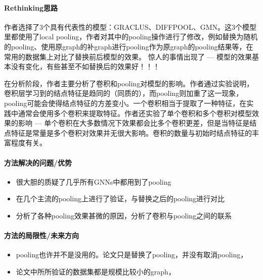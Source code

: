 \paragraph{Rethinking思路}
作者选择了3个具有代表性的模型：GRACLUS\cite{dhillon2007weighted}、DIFFPOOL\cite{ying2019hierarchical}、GMN\cite{khasahmadi2020memory-based}。这3个模型里都使用了local pooling，作者对其中的pooling操作进行了修改，例如替换为随机的pooling、使用原graph的补graph进行pooling作为原graph的pooling结果等，在常用的数据集上对比了替换前后模型的效果。
惊人的事情出现了 --- 模型的效果基本没有变化，有些甚至不如替换后的效果好！！！

在分析阶段，作者主要分析了卷积和pooling对模型的影响。作者通过实验说明，卷积层学习到的结点特征是趋同的（同质的），而pooling则加重了这一现象，pooling可能会使得结点特征的方差变小。一个卷积相当于提取了一种特征，在实践中通常会使用多个卷积来提取特征。作者还实验了单个卷积和多个卷积对模型效果的影响 --- 单个卷积在大多数情况下效果都会比多个卷积更差，但是当特征是结点特征是常量是多个卷积对效果并无很大影响。卷积的数量与初始时结点特征的丰富程度有关。


\paragraph{方法解决的问题/优势}

\begin{itemize}
	\item 很大胆的质疑了几乎所有GNNs中都用到了pooling
	\item 在几个主流的pooling上进行了验证，与替换之后的pooling进行对比
	\item 分析了各种pooling效果甚微的原因，分析了卷积与pooling之间的联系

\end{itemize}


\paragraph{方法的局限性/未来方向}

\begin{itemize}
	\item pooling也许并不是没用的。论文只是替换了pooling，并没有取消pooling，
	\item 论文中所所验证的数据集都是规模比较小的graph，
\end{itemize}